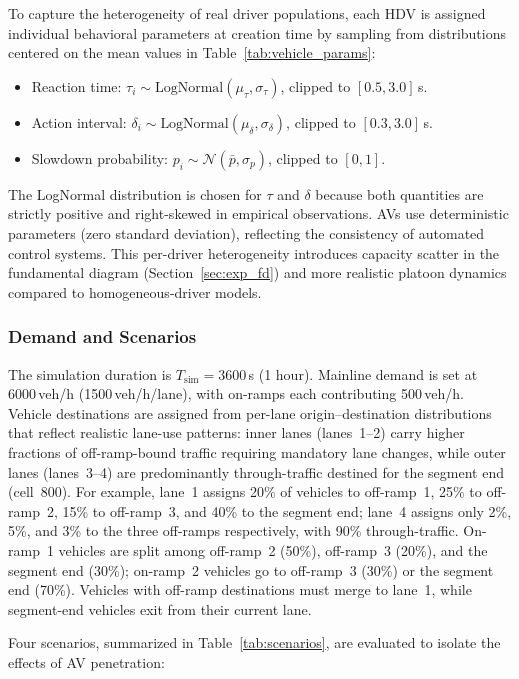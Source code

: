 \documentclass[review,authoryear]{elsarticle}
\begin{document}
To capture the heterogeneity of real driver populations, each HDV is assigned individual behavioral parameters at creation time by sampling from distributions centered on the mean values in Table~\ref{tab:vehicle_params}:
\begin{itemize}
    \item Reaction time: $\tau_i \sim \text{LogNormal}(\mu_\tau, \sigma_\tau)$, clipped to $[0.5, 3.0]$\,s.
    \item Action interval: $\delta_i \sim \text{LogNormal}(\mu_\delta, \sigma_\delta)$, clipped to $[0.3, 3.0]$\,s.
    \item Slowdown probability: $p_i \sim \mathcal{N}(\bar{p}, \sigma_p)$, clipped to $[0, 1]$.
\end{itemize}
The LogNormal distribution is chosen for $\tau$ and $\delta$ because both quantities are strictly positive and right-skewed in empirical observations. AVs use deterministic parameters (zero standard deviation), reflecting the consistency of automated control systems. This per-driver heterogeneity introduces capacity scatter in the fundamental diagram (Section~\ref{sec:exp_fd}) and more realistic platoon dynamics compared to homogeneous-driver models.

\subsubsection{Demand and Scenarios}

The simulation duration is $T_{\text{sim}} = 3600$\,s (1 hour). Mainline demand is set at 6000\,veh/h (1500\,veh/h/lane), with on-ramps each contributing 500\,veh/h. Vehicle destinations are assigned from per-lane origin--destination distributions that reflect realistic lane-use patterns: inner lanes (lanes~1--2) carry higher fractions of off-ramp-bound traffic requiring mandatory lane changes, while outer lanes (lanes~3--4) are predominantly through-traffic destined for the segment end (cell~800). For example, lane~1 assigns 20\% of vehicles to off-ramp~1, 25\% to off-ramp~2, 15\% to off-ramp~3, and 40\% to the segment end; lane~4 assigns only 2\%, 5\%, and 3\% to the three off-ramps respectively, with 90\% through-traffic. On-ramp~1 vehicles are split among off-ramp~2 (50\%), off-ramp~3 (20\%), and the segment end (30\%); on-ramp~2 vehicles go to off-ramp~3 (30\%) or the segment end (70\%). Vehicles with off-ramp destinations must merge to lane~1, while segment-end vehicles exit from their current lane.

Four scenarios, summarized in Table~\ref{tab:scenarios}, are evaluated to isolate the effects of AV penetration:
\end{document}
